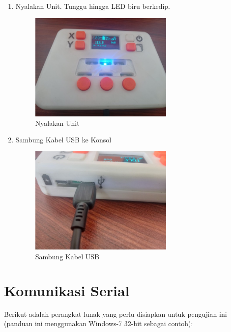 \documentclass[12pt]{book}
\begin{document}
\begin{enumerate}
		\newpage
		\item Nyalakan Unit. Tunggu hingga LED biru berkedip.
		\begin{figure}[!ht]
			\centering
			\includegraphics[width=200pt]{images/pasang/nyalakan_unit}
			\caption{Nyalakan Unit}
		\end{figure}
		\item Sambung Kabel USB ke Konsol
		\begin{figure}[!ht]
			\centering
			\includegraphics[width=200pt]{images/pasang/sambung_usb}
			\caption{Sambung Kabel USB}
		\end{figure}
	\end{enumerate}

    \section{Komunikasi Serial}

    Berikut adalah perangkat lunak yang perlu disiapkan untuk pengujian ini
    (panduan ini menggunakan Windows-7 32-bit sebagai contoh):
\end{document}
